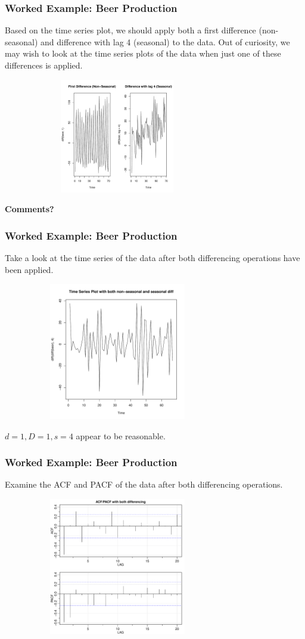 \documentclass[%
xcolor=pdftex]{beamer}
\begin{document}
\begin{frame}
\frametitle{Worked Example: Beer Production}

Based on the time series plot, we should apply both a first difference (non-seasonal) and difference with lag 4 (seasonal) to the data. Out of curiosity, we may wish to look at the time series plots of the data when just one of these differences is applied.

\includegraphics[width=100mm, height=50mm]{beer_tsdiff.pdf}

\textbf{Comments?}


\end{frame}

\begin{frame}
\frametitle{Worked Example: Beer Production}

Take a look at the time series of the data after both differencing operations have been applied.

\includegraphics[width=100mm, height=60mm]{beer_tssta.pdf}

$d=1, D=1, s=4$ appear to be reasonable.


\end{frame}

\begin{frame}
\frametitle{Worked Example: Beer Production}

Examine the ACF and PACF of the data after both differencing operations.

\includegraphics[width=100mm, height=60mm]{beer_acf.pdf}

\end{frame}
\end{document}
